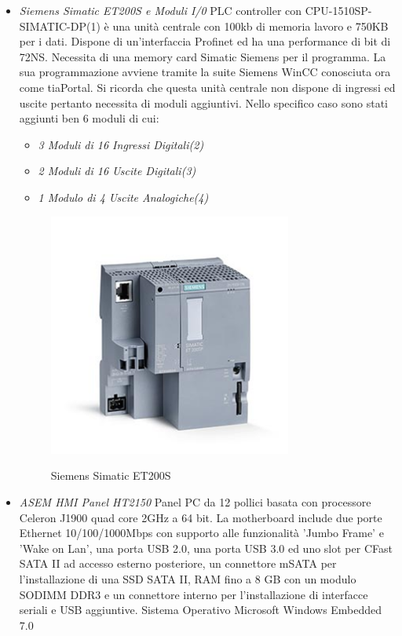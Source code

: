 \documentclass[12pt, a4paper, oneside]{book}
\begin{document}
\begin{itemize}
	\item \textit{Siemens Simatic ET200S e Moduli I/0}	
	PLC controller con CPU-1510SP-SIMATIC-DP(1) è una unità centrale con 100kb di memoria lavoro e 750KB per i dati. Dispone di un'interfaccia Profinet ed ha una performance di bit di 72NS. Necessita di una memory card Simatic Siemens per il programma.
	La sua programmazione avviene tramite la suite Siemens WinCC conosciuta ora come tiaPortal. 
	Si ricorda che questa unità centrale non dispone di ingressi ed uscite pertanto necessita di moduli aggiuntivi. Nello specifico caso sono stati aggiunti ben 6 moduli di cui:
	\begin{itemize}
		\item \textit{3 Moduli di 16 Ingressi Digitali(2)}
		\item \textit{2 Moduli di 16 Uscite Digitali(3)}
		\item \textit{1 Modulo di 4 Uscite Analogiche(4)}
	\end{itemize}

	\begin{figure}[H]
	\centering
	\includegraphics[width=8cm]{Immagini/ELE11}
	\label{ele11}
	\caption{Siemens Simatic ET200S}
	\end{figure}

	\item \textit{ASEM HMI Panel HT2150}
	Panel PC da 12 pollici basata con processore Celeron J1900 quad core 2GHz a 64 bit.	La motherboard include due porte Ethernet 10/100/1000Mbps con supporto alle funzionalità 'Jumbo Frame' e 'Wake on Lan', una porta USB 2.0, una porta USB 3.0 ed uno slot per CFast SATA II ad accesso esterno posteriore, un connettore mSATA per l'installazione di una SSD SATA II, RAM fino a 8 GB con un modulo SODIMM DDR3 e un connettore interno per l'installazione di interfacce seriali e USB aggiuntive.
	Sistema Operativo Microsoft Windows Embedded 7.0
	

\end{itemize}
\end{document}
